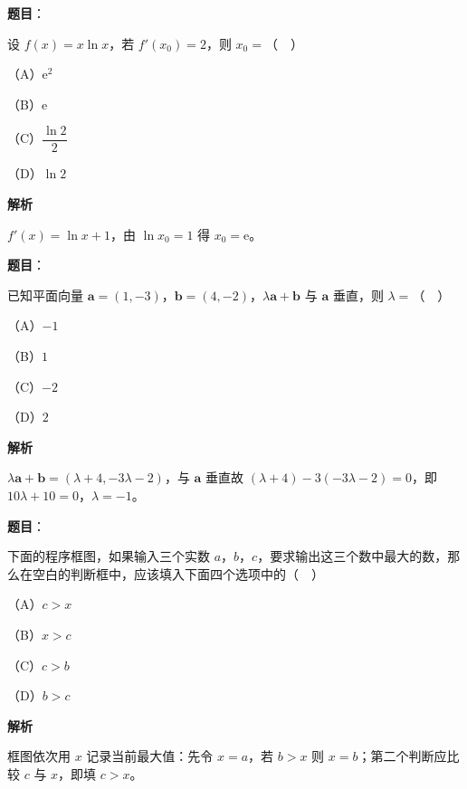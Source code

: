 \begin{answer}

\textbf{题目}：

设 $f(x)=x\ln x$，若 $f'(x_0)=2$，则 $x_0=$（　）

（A）$\mathrm e^2$

（B）$\mathrm e$

（C）$\dfrac{\ln2}2$

（D）$\ln2$

\textbf{解析}

$f'(x)=\ln x+1$，由 $\ln x_0=1$ 得 $x_0=\mathrm e$。


\end{answer}
\begin{answer}

\textbf{题目}：

已知平面向量 $\boldsymbol a=(1,-3)$，$\boldsymbol b=(4,-2)$，$\lambda\boldsymbol a+\boldsymbol b$ 与 $\boldsymbol a$ 垂直，则 $\lambda=$（　）

（A）$-1$

（B）$1$

（C）$-2$

（D）$2$

\textbf{解析}

$\lambda\boldsymbol a+\boldsymbol b=(\lambda+4,-3\lambda-2)$，与 $\boldsymbol a$ 垂直故 $(\lambda+4)-3(-3\lambda-2)=0$，即 $10\lambda+10=0$，$\lambda=-1$。


\end{answer}
\begin{answer}

\textbf{题目}：

下面的程序框图，如果输入三个实数 $a$，$b$，$c$，要求输出这三个数中最大的数，那么在空白的判断框中，应该填入下面四个选项中的（　）

（A）$c>x$

（B）$x>c$

（C）$c>b$

（D）$b>c$
\nopagebreak[4]
\begin{center}\end{center}
\nopagebreak[4]
\textbf{解析}

框图依次用 $x$ 记录当前最大值：先令 $x=a$，若 $b>x$ 则 $x=b$；第二个判断应比较 $c$ 与 $x$，即填 $c>x$。


\end{answer}
